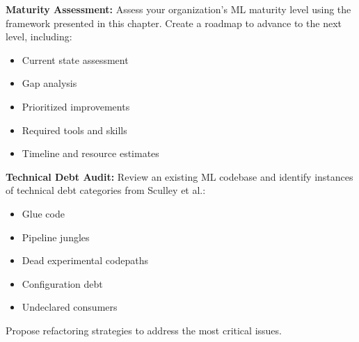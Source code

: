 \begin{exercise}
\textbf{Maturity Assessment:} Assess your organization's ML maturity level using the framework presented in this chapter. Create a roadmap to advance to the next level, including:
\begin{itemize}
    \item Current state assessment
    \item Gap analysis
    \item Prioritized improvements
    \item Required tools and skills
    \item Timeline and resource estimates
\end{itemize}
\end{exercise}

\begin{exercise}
\textbf{Technical Debt Audit:} Review an existing ML codebase and identify instances of technical debt categories from Sculley et al.:
\begin{itemize}
    \item Glue code
    \item Pipeline jungles
    \item Dead experimental codepaths
    \item Configuration debt
    \item Undeclared consumers
\end{itemize}
Propose refactoring strategies to address the most critical issues.
\end{exercise}
